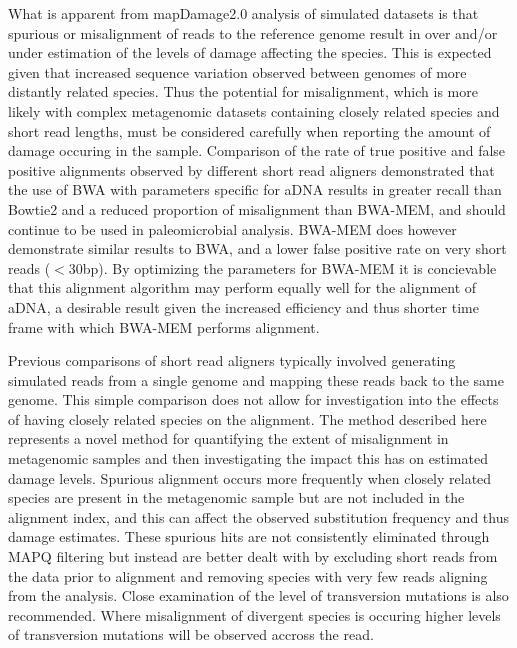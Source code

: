 \documentclass[12pt, a4paper]{article}
\begin{document}
What is apparent from mapDamage2.0 analysis of simulated datasets is that spurious or misalignment of reads to the reference genome result in over and/or under estimation of the levels of damage affecting the species. 
This is expected given that increased sequence variation observed between genomes of more distantly related species.
Thus the potential for misalignment, which is more likely with complex metagenomic datasets containing closely related species and short read lengths, must be considered carefully when reporting the amount of damage occuring in the sample. 
Comparison of the rate of true positive and false positive alignments observed by different short read aligners demonstrated that the use of BWA with parameters specific for aDNA results in greater recall than Bowtie2 and a reduced proportion of misalignment than BWA-MEM, and should continue to be used in paleomicrobial analysis. 
BWA-MEM does however demonstrate similar results to BWA, and a lower false positive rate on very short reads ($<$30bp).
By optimizing the parameters for BWA-MEM it is concievable that this alignment algorithm may perform equally well for the alignment of aDNA, a desirable result given the increased efficiency and thus shorter time frame with which BWA-MEM performs alignment.

Previous comparisons of short read aligners typically involved generating simulated reads from a single genome and mapping these reads back to the same genome. 
This simple comparison does not allow for investigation into the effects of having closely related species on the alignment.
The method described here represents a novel method for quantifying the extent of misalignment in metagenomic samples and then investigating the impact this has on estimated damage levels.
Spurious alignment occurs more frequently when closely related species are present in the metagenomic sample but are not included in the alignment index, and this can affect the observed substitution frequency and thus damage estimates. 
These spurious hits are not consistently eliminated through MAPQ filtering but instead are better dealt with by excluding short reads from the data prior to alignment and removing species with very few reads aligning from the analysis. 
Close examination of the level of transversion mutations is also recommended. 
Where misalignment of divergent species is occuring higher levels of transversion mutations will be observed accross the read. 
\end{document}
